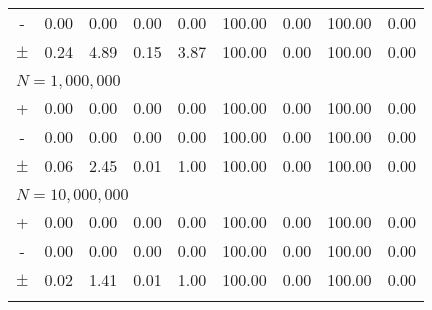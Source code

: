 \documentclass[11pt, oneside]{amsart}   	%
\begin{document}
\begin{table}[ht]
\begin{center}
\begin{tabular}{ c c c c c c c c c }
- 		& 0.00 & 0.00 & 0.00 & 0.00 & 100.00 & 0.00 & 100.00 & 0.00 \\
$\pm$ 	& 0.24 & 4.89 & 0.15 & 3.87 & 100.00 & 0.00 & 100.00 & 0.00 \\
\\ \multicolumn{9}{l}{$N = 1,000,000$} \\ \hline
+ 		& 0.00 & 0.00 & 0.00 & 0.00 & 100.00 & 0.00 & 100.00 & 0.00 \\
- 		& 0.00 & 0.00 & 0.00 & 0.00 & 100.00 & 0.00 & 100.00 & 0.00 \\
$\pm$ 	& 0.06 & 2.45 & 0.01 & 1.00 & 100.00 & 0.00 & 100.00 & 0.00 \\
\\ \multicolumn{9}{l}{$N = 10,000,000$} \\ \hline
+ 		& 0.00 & 0.00 	& 0.00 & 0.00 	& 100.00 & 0.00 & 100.00 & 0.00 \\
- 		& 0.00 & 0.00 	& 0.00 & 0.00 	& 100.00 & 0.00 & 100.00 & 0.00 \\
$\pm$ 	& 0.02 & 1.41 & 0.01 & 1.00 & 100.00 & 0.00 & 100.00 & 0.00 \\
\\ \hline
\end{tabular}
\end{center}
\end{table}
\end{document}
